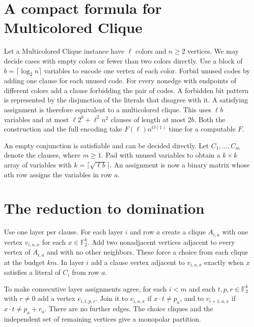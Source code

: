 \documentclass[11pt]{article}
\begin{document}
\section{A compact formula for Multicolored Clique}

Let a Multicolored Clique instance have $\ell$ colors and $n\ge2$ vertices.
We may decide cases with empty colors or fewer than two colors directly.
Use a block of $b=\lceil\log_2 n\rceil$ variables to encode one vertex of
each color. Forbid unused codes by adding one clause for each unused code.
For every nonedge with endpoints of different colors add a clause forbidding
the pair of codes. A forbidden bit pattern is represented by the disjunction
of the literals that disagree with it. A satisfying assignment is therefore
equivalent to a multicolored clique. This uses $\ell b$ variables and at most
$\ell 2^b+\ell^2 n^2$ clauses of length at most $2b$. Both the construction
and the full encoding take $F(\ell)n^{O(1)}$ time for a computable $F$.

An empty conjunction is satisfiable and can be decided directly. Let
$C_1,\ldots,C_m$ denote the clauses, where $m\ge1$. Pad with unused
variables to obtain a $k\times k$ array of variables with
$k=\lceil\sqrt{\ell b}\rceil$. An assignment is now a binary matrix
whose $a$th row assigns the variables in row $a$.

\section{The reduction to domination}

Use one layer per clause. For each layer $i$ and row $a$ create a clique
$A_{i,a}$ with one vertex $v_{i,a,x}$ for each $x\in\mathbb F_2^k$.
Add two nonadjacent vertices adjacent to every vertex of $A_{i,a}$ and
with no other neighbors. These force a choice from each clique at the
budget $km$. In layer $i$ add a clause vertex adjacent to $v_{i,a,x}$
exactly when $x$ satisfies a literal of $C_i$ from row $a$.

To make consecutive layer assignments agree, for each $i<m$ and
each $t,p,r\in\mathbb F_2^k$ with $r\ne0$ add a vertex $e_{i,t,p,r}$.
Join it to $v_{i,a,x}$ if $x\cdot t\ne p_a$, and to $v_{i+1,a,x}$ if
$x\cdot t\ne p_a+r_a$. There are no further edges. The choice cliques
and the independent set of remaining vertices give a monopolar partition.
\end{document}
